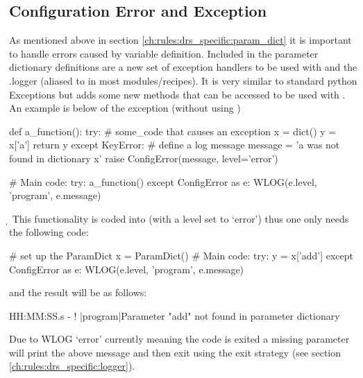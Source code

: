 \subsection{Configuration Error and Exception}
\label{ch:rules:drs_specific:config_error}

As mentioned above in section \ref{ch:rules:drs_specific:param_dict} it is important to handle errors caused by variable definition. Included in the parameter dictionary definitions are a new set of exception handlers to be used with \ParamDict and the \spirouLog.logger (aliased to \WLOG in most modules/recipes). It is very similar to standard python Exceptions but adds some new methods that can be accessed to be used with \WLOG. \\

An example is below of the \ConfigError exception (without using \ParamDict)

\begin{pythonbox}
def a_function():
    try:
        # some_code that causes an exception
        x = dict()
        y = x['a']
        return y
    except KeyError:
        # define a log message
        message = 'a was not found in dictionary x'
        raise ConfigError(message, level='error')

# Main code:
try:
    a_function()
except ConfigError as e:
    WLOG(e.level, 'program', e.message)
\end{pythonbox}\d
\vspace{0.5cm}
\noindent This functionality is coded into \ParamDict (with a \WLOG level set to `error') thus one only needs the following code:
\begin{pythonbox}
# set up the ParamDict
x = ParamDict()
# Main code:
try:
    y = x['add']
except ConfigError as e:
    WLOG(e.level, 'program', e.message)
\end{pythonbox}
\noindent and the result will be as follows:
\begin{cmdboxprint}
HH:MM:SS.s - ! |program|Parameter "add" not found in parameter dictionary
\end{cmdboxprint}
\begin{note}
Due to WLOG `error' currently meaning the code is exited a missing parameter will print the above message and then exit using the  exit strategy (see section \ref{ch:rules:drs_specific:logger}).
\end{note}